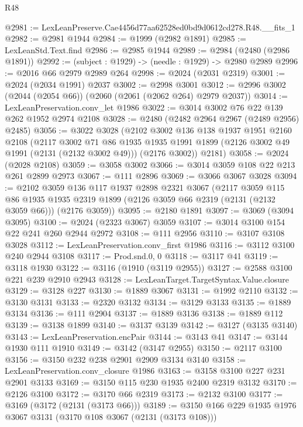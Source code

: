 \begin{lexlean}{R48}
\begin{coremodule}
@2981 := LexLeanPreserve.Cae4456d77aa62528ed0bd9d0612cd278.R48.__fits_1
@2982 := @2981 @1944
@2984 := @1999 (@2982 @1891)
@2985 := LexLeanStd.Text.find
@2986 := @2985 @1944
@2989 := @2984 (@2480 (@2986 @1891))
@2992 := (subject : @1929) -> (needle : @1929) -> @2980 @2989
@2996 := @2016 @66 @2979 @2989 @264
@2998 := @2024 (@2031 @2319)
@3001 := @2024 (@2034 @1991) @2037
@3002 := @2998 @3001
@3012 := @2996 @3002 (@2044 (@2054 @66)) (@2060 (@2061 (@2062 @264) @2979 @2037))
@3014 := LexLeanPreservation.conv_let @1986
@3022 := @3014 @3002 @76 @22 @139 @262 @1952 @2974 @2108
@3028 := @2480 (@2482 @2964 @2967 (@2489 @2956) @2485)
@3056 := @3022
    @3028
    (@2102
      @3002
      @136
      @138
      @1937
      @1951
      @2160
      @2108
      (@2117
        @3002
        @71
        @86
        @1935
        @1935
        @1991
        @1899
        (@2126 @3002 @49 @1991 (@2131 (@2132 @3002 @49)))
        (@2176 @3002))
      @2181)
@3058 := @2024 (@2028 @2108)
@3059 := @3058 @3002
@3066 := @3014 @3059 @108 @22 @213 @261 @2899 @2973
@3067 := @111 @2896
@3069 := @3066 @3067 @3028
@3094 := @2102
    @3059
    @136
    @117
    @1937
    @2898
    @2321
    @3067
    (@2117
      @3059
      @115
      @86
      @1935
      @1935
      @2319
      @1899
      (@2126 @3059 @66 @2319 (@2131 (@2132 @3059 @66)))
      (@2176 @3059))
@3095 := @2180 @1891
@3097 := @3069 (@3094 @3095)
@3100 := @2024 (@2323 @3067) @3059
@3107 := @3014 @3100 @154 @22 @241 @260 @2944 @2972
@3108 := @111 @2956
@3110 := @3107 @3108 @3028
@3112 := LexLeanPreservation.conv_first @1986
@3116 := @3112 @3100 @240 @2944 @3108
@3117 := Prod.snd.{0, 0}
@3118 := @3117 @41
@3119 := @3118 @1930
@3122 := @3116 (@1910 (@3119 @2955))
@3127 := @2588 @3100 @221 @239 @2910 @2943
@3128 := LexLeanTarget.TargetSyntax.Value.closure
@3129 := @3128 @227
@3130 := @1889 @3067
@3131 := @1992 @2110
@3132 := @3130 @3131
@3133 := @2320 @3132
@3134 := @3129 @3133
@3135 := @1889 @3134
@3136 := @111 @2904
@3137 := @1889 @3136
@3138 := @1889 @112
@3139 := @3138 @1899
@3140 := @3137 @3139
@3142 := @3127 (@3135 @3140)
@3143 := LexLeanPreservation.encPair
@3144 := @3143 @41
@3147 := @3144 @1930 @111 @1910
@3149 := @3142 (@3147 @2955)
@3150 := @2117 @3100
@3156 := @3150 @232 @238 @2901 @2909 @3134 @3140
@3158 := LexLeanPreservation.conv_closure @1986
@3163 := @3158 @3100 @227 @231 @2901 @3133
@3169 := @3150 @115 @230 @1935 @2400 @2319 @3132
@3170 := @2126 @3100
@3172 := @3170 @66 @2319
@3173 := @2132 @3100
@3177 := @3169 (@3172 (@2131 (@3173 @66)))
@3189 := @3150 @166 @229 @1935 @1976 @3067 @3131 (@3170 @108 @3067 (@2131 (@3173 @108)))

\end{coremodule}
\end{lexlean}

